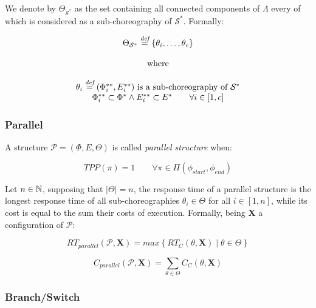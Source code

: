 We denote by $\Theta_{\mathcal{S}^*}$ as the set containing all connected components of $\Lambda$ every of which is considered as a sub-choreography of $\mathcal{S}^*$. Formally:

\begin{equation}
	\begin{array}{c}
		\Theta_{\mathcal{S}^*} \overset{\textit{def}}{=} \left\lbrace \theta_i, \ldots ,\theta_c \right\rbrace \\\\
		\text{ where } \\\\
		
		\theta_i \overset{\textit{def}}{=} (\Phi^{**}_i, E^{**}_i) \text{ is a sub-choreography of } \mathcal{S}^* \\
		 \Phi^{**}_i \subset \Phi^{*} \wedge E^{**}_i \subset E^{*} \qquad \forall i \in \left[ 1, c \right] \\
	\end{array}
\end{equation} 

\subsubsection{Parallel}

A structure $\mathcal{P} = (\Phi,E,\Theta)$ is called \textit{parallel structure} when:

\begin{equation}
	TPP(\pi) = 1 \qquad \forall \pi \in \Pi(\phi_{start}, \phi_{end})
\end{equation}

Let $n \in \mathbb{N}$, supposing that $|\Theta| = n$, the response time of a parallel structure is the longest response time of all sub-choreographies $\theta_i \in \Theta$ for all $i \in \left[ 1, n \right]$, while its cost is equal to the sum their costs of execution. Formally, being $\textbf{X}$ a configuration of  $\mathcal{P}$:

\begin{equation}
	RT_{parallel}(\mathcal{P}, \textbf{X}) = max \left\lbrace RT_C(\mathcal{\theta}, \textbf{X}) \mid \theta \in \Theta \right\rbrace 
\end{equation}

\begin{equation}
	C_{parallel}(\mathcal{P}, \textbf{X}) = \sum_{\theta \in \Theta} C_C(\theta, \textbf{X})
\end{equation}



\subsubsection{Branch/Switch}

